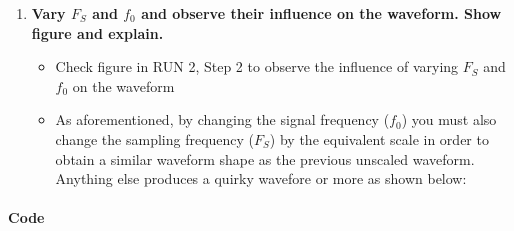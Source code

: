 \documentclass[11pt]{article}
\providecommand{\tightlist}{%
      \setlength{\itemsep}{0pt}\setlength{\parskip}{0pt}}
\begin{document}
    \begin{enumerate}
\def\labelenumi{\arabic{enumi}.}
\setcounter{enumi}{3}
\item
  \textbf{Vary \(F_S\) and \(f_0\) and observe their influence on the
  waveform. Show figure and explain.}

  \begin{itemize}
  \tightlist
  \item
    Check figure in RUN 2, Step 2 to observe the influence of varying
    \(F_S\) and \(f_0\) on the waveform
  \item
    As aforementioned, by changing the signal frequency (\(f_0\)) you
    must also change the sampling frequency (\(F_S\)) by the equivalent
    scale in order to obtain a similar waveform shape as the previous
    unscaled waveform. Anything else produces a quirky wavefore or more
    as shown below:
  \end{itemize}
\end{enumerate}

\hypertarget{code}{%
\paragraph{Code}\label{code}}
\end{document}
